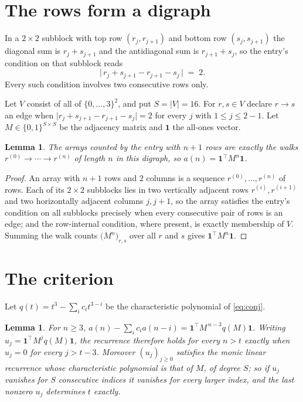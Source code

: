 \documentclass[11pt,a4paper]{article}
\theoremstyle{plain}
\newtheorem{lemma}[theorem]{Lemma}
\theoremstyle{definition}
\begin{document}
\section{The rows form a digraph}

In a $2\times2$ subblock with top row $(r_j,r_{j+1})$ and bottom row $(s_j,s_{j+1})$ the
diagonal sum is $r_j+s_{j+1}$ and the antidiagonal sum is $r_{j+1}+s_j$, so the entry's
condition on that subblock reads
\[
\bigl|\,r_j+s_{j+1}-r_{j+1}-s_j\,\bigr|\;=\;2.
\]
Every such condition involves two consecutive rows only.

Let $V$ consist of all of $\{0,\dots,3\}^{2}$, and put $S=|V|=16$. For $r,s\in V$ declare $r\to s$ an edge
when $\bigl|r_j+s_{j+1}-r_{j+1}-s_j\bigr|=2$ for every $j$ with
$1\le j\le2-1$. Let $M\in\{0,1\}^{S\times S}$ be the adjacency matrix and $\mathbf{1}$
the all-ones vector.

\begin{lemma}\label{lem:walk}
The arrays counted by the entry with $n+1$ rows are exactly the walks
$r^{(0)}\to\cdots\to r^{(n)}$ of length $n$ in this digraph, so
$a(n)=\mathbf{1}^{\!\top}M^{n}\mathbf{1}$.
\end{lemma}

\begin{proof}
An array with $n+1$ rows and $2$ columns is a sequence $r^{(0)},\dots,r^{(n)}$ of
rows. Each of its $2\times2$ subblocks lies in two vertically adjacent rows
$r^{(i)},r^{(i+1)}$ and two horizontally adjacent columns $j,j+1$, so the array satisfies
the entry's condition on all subblocks precisely when every consecutive pair of rows is an
edge; and the row-internal condition, where present, is exactly membership of $V$. Summing
the walk counts $\bigl(M^{n}\bigr)_{r,s}$ over all $r$ and $s$ gives
$\mathbf{1}^{\!\top}M^{n}\mathbf{1}$.
\end{proof}

\section{The criterion}

Let $q(t)=t^{3}-\sum_i c_i t^{3-i}$ be the characteristic polynomial of
\eqref{eq:conj}.

\begin{lemma}\label{lem:crit}
For $n\ge3$,
$a(n)-\sum_i c_i a(n-i)=\mathbf{1}^{\!\top}M^{\,n-3}q(M)\mathbf{1}$. Writing
$u_j=\mathbf{1}^{\!\top}M^{j}q(M)\mathbf{1}$, the recurrence therefore holds for every
$n>t$ exactly when $u_j=0$ for every $j>t-3$. Moreover $(u_j)_{j\ge0}$ satisfies the
monic linear recurrence whose characteristic polynomial is that of $M$, of degree $S$; so
if $u_j$ vanishes for $S$ consecutive indices it vanishes for every larger index, and the
last nonzero $u_j$ determines $t$ exactly.
\end{lemma}
\end{document}
